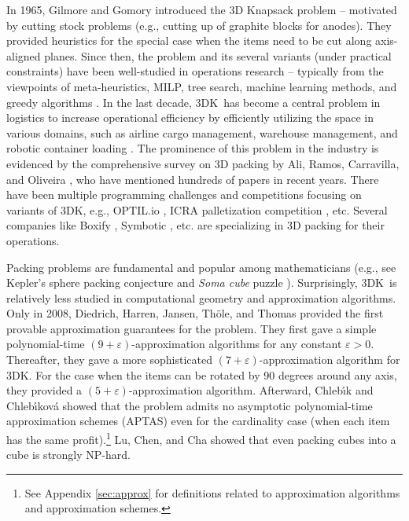 \documentclass[10pt,a4paper]{amsart}
\newcommand{\eps}{\varepsilon}
\newcommand{\tdk}{\textsc{3DK}}
\theoremstyle{definition}
\begin{document}
In 1965, Gilmore and Gomory \cite{gilmore1965multistage} introduced the 3D Knapsack problem -- motivated by cutting stock problems (e.g., cutting up of graphite blocks for anodes). They provided heuristics for the special case when the items need to be cut along axis-aligned planes.
Since then, the problem and its several variants (under practical constraints) have been well-studied in operations research -- typically from the viewpoints of meta-heuristics, MILP, tree search, machine learning methods, and greedy algorithms \cite{cacchiani2022knapsack, silva2019exact}.
In the last decade, \tdk~has become a central problem in logistics to increase operational efficiency by efficiently utilizing the space in various domains, such as airline cargo management, warehouse management, and robotic container loading \cite{ali2022line}.
The prominence of this problem in the industry is evidenced by the comprehensive survey on 3D packing by Ali, Ramos, Carravilla, and Oliveira \cite{ali2022line}, who have mentioned hundreds of papers in recent years.  
There have been multiple programming challenges and competitions focusing on variants of \tdk, e.g., OPTIL.io \cite{optil}, ICRA palletization competition \cite{vmac}, etc.   
Several companies like Boxify \cite{boxify}, Symbotic \cite{symbotic}, etc. are specializing in 3D packing for their operations.  

Packing problems are fundamental and popular among mathematicians (e.g., see Kepler's sphere packing conjecture \cite{lagarias2011kepler} and {\em Soma cube} puzzle \cite{goodman2019soma}). 
Surprisingly, \tdk~is relatively less studied in computational geometry and approximation algorithms. 
Only in 2008, Diedrich, Harren, Jansen, Th{\"{o}}le, and Thomas \cite{3d-knapsack} provided the first provable approximation guarantees for the problem. They first gave a simple polynomial-time $(9+\eps)$-approximation algorithms for any constant $\eps>0$. Thereafter, they gave a more sophisticated $(7+\eps)$-approximation algorithm for \tdk. For the case when the items can be rotated by 90 degrees around any axis, they provided a $(5+\eps)$-approximation algorithm. 
Afterward, Chleb{\'{\i}}k and Chleb{\'{\i}}kov{\'{a}} \cite{ChlebikC09} showed that the problem admits no asymptotic polynomial-time approximation schemes (APTAS) even for the cardinality case (when each item has the same profit).\footnote{See Appendix \ref{sec:approx} for definitions related to approximation algorithms and approximation schemes.} Lu, Chen, and Cha \cite{lu2015packing1} showed that even packing cubes into a cube is strongly NP-hard. 
\end{document}
